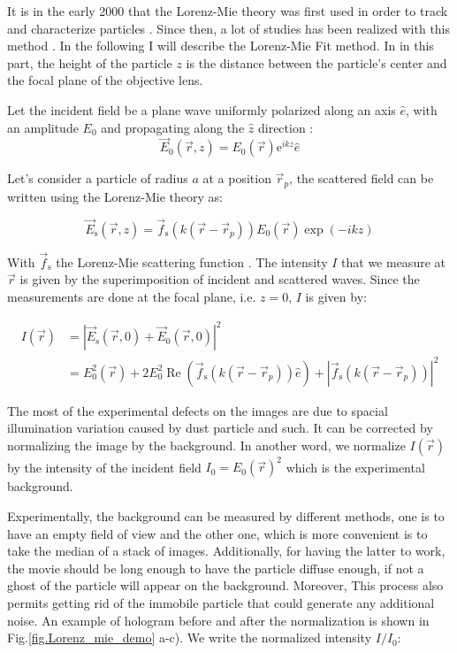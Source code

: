 It is in the early 2000 that the Lorenz-Mie theory was first used in order to track and characterize particles \cite{ovryn_imaging_2000, lee_characterizing_2007}. Since then, a lot of studies has been realized with this method \cite{katz_applications_2010}. In the following I will describe the Lorenz-Mie Fit method. In in this part, the height of the particle $z$ is the distance between the particle's center and the focal plane of the objective lens.

Let the incident field be a plane wave uniformly polarized along an axis $ \hat{e}$, with an amplitude $E_0$ and propagating along the $\hat{z}$ direction :
\begin{equation}
	\vec{E}_0(\vec{r},z) = E_0(\vec{r}) \mathrm{e}^{ikz}\hat{e}
\end{equation}

Let's consider a particle of radius $a$ at a position $\vec{r}_p $, the scattered field can be written using the Lorenz-Mie theory \cite{f_bohren_absorption_1998} as:

\begin{equation}
	\vec{E}_\mathrm{s}(\vec{r}, z) =  \vec{f}_\mathrm{s}(k(\vec{r} - \vec{r}_p))E_0(\vec{r}) \exp \left(-ikz\right) 
\end{equation} 

With $\vec{f}_\mathrm{s}$ the Lorenz-Mie scattering function \cite{f_bohren_absorption_1998}. The intensity $I$ that we measure at $\vec{r}$ is given by the superimposition of incident and scattered waves. Since the measurements are done at the focal plane, i.e. $z = 0 $, $I$ is given by:

\begin{equation}
	\begin{aligned}
	I(\vec{r}) & = |\vec{E}_\mathrm{s}(\vec{r}, 0) + \vec{E}_0(\vec{r}, 0)|^2 \\
	& = E_0^2(\vec{r}) + 2 E_0^2\operatorname{Re} \left(\vec{f}_\mathrm{s}(k(\vec{r}- \vec{r}_p)) \hat{e}\right) + | \vec{f}_\mathrm{s}(k(\vec{r}- \vec{r}_p)) |^2
	\end{aligned}
\end{equation}

The most of the experimental defects on the images are due to spacial illumination variation caused by dust particle and such. It can be corrected by normalizing the image by the background. In another word, we normalize  $I(\vec{r})$ by the intensity of the incident field $I_0 = E_0(\vec{r})^2$ which is the experimental background. 

Experimentally, the background can be measured by different methods, one is to have an empty field of view and the other one, which is more convenient is to take the median of a stack of images. Additionally, for having the latter to work, the movie should be long enough to have the particle diffuse enough, if not a ghost of the particle will appear on the background. Moreover, This process also permits getting rid of the immobile particle that could generate any additional noise. An example of hologram before and after the normalization is shown in Fig.\ref{fig.Lorenz_mie_demo} a-c). We write the normalized intensity $I/I_0$:

